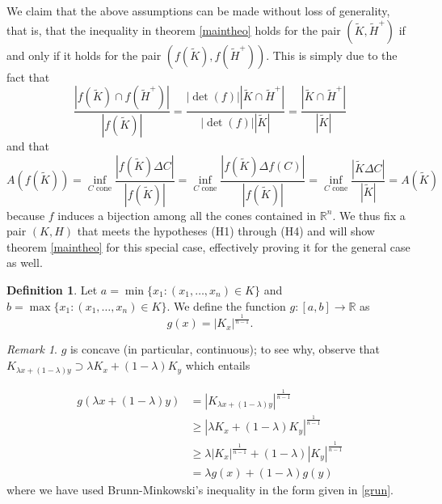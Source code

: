 \documentclass[12pt,reqno]{amsart}
\theoremstyle{plain}
\theoremstyle{definition}
\newtheorem{defi}[teor]{Definition}
\theoremstyle{remark}
\newtheorem{nota}[teor]{Remark}
\numberwithin{equation}{section}
\begin{document}
We claim that the above assumptions can be made without loss of generality, that is, that the inequality in theorem \ref{maintheo} holds for the pair $(\tilde K,\tilde H^+)$ if and only if it holds for the pair $(f(\tilde K), f(\tilde H^+))$. This is simply due to the fact that
$$\frac{|f(\tilde K)\cap f(\tilde H^+)|}{|f(\tilde K)|}=\frac{|\det(f)||\tilde K\cap \tilde H^+|}{|\det (f)||\tilde K|}=\frac{|\tilde K\cap \tilde H^+|}{|\tilde K|}$$
and that
$$A(f(\tilde K))=\inf_{C \text{ cone}}\frac{|f(\tilde K)\Delta C|}{|f(\tilde K)|}=\inf_{C \text{ cone}}\frac{|f(\tilde K)\Delta f(C)|}{|f(\tilde K)|}=\inf_{C \text{ cone}}\frac{|\tilde K\Delta C|}{|\tilde K|}=A(\tilde K)$$
because $f$ induces a bijection among all the cones contained in $\mathbb{R}^n$. We thus fix a pair $(K,H)$ that meets the hypotheses (H1) through (H4) and will show theorem \ref{maintheo} for this special case, effectively proving it for the general case as well.

\begin{defi}\label{defi_n_geq_2}
    Let $a=\min \{x_1:(x_1,\ldots,x_n)\in K\}$ and $b=\max \{x_1:(x_1,\ldots,x_n)\in K\}$. We define the function $g:[a,b]\to \mathbb{R}$ as $$g(x)=|K_x|^\frac 1{n-1}.$$
\end{defi}
\begin{nota}
    $g$ is concave (in particular, continuous); to see why, observe that $K_{\lambda x + (1-\lambda)y}\supset \lambda K_x+(1-\lambda)K_y$ which entails
    
    \begin{align*}
        g(\lambda x + (1-\lambda)y)&=|K_{\lambda x + (1-\lambda)y}|^{\frac 1 {n-1}}\\
        &\geq |\lambda K_x+(1-\lambda)K_y|^{\frac 1 {n-1}}\\
        &\geq \lambda |K_x|^{\frac 1{n-1}}+(1-\lambda) |K_y|^{\frac 1{n-1}}\\
        &=\lambda g(x)+(1-\lambda)g(y)
    \end{align*}
    where we have used Brunn-Minkowski's inequality in the form given in \eqref{grun}.
\end{nota}
\end{document}
